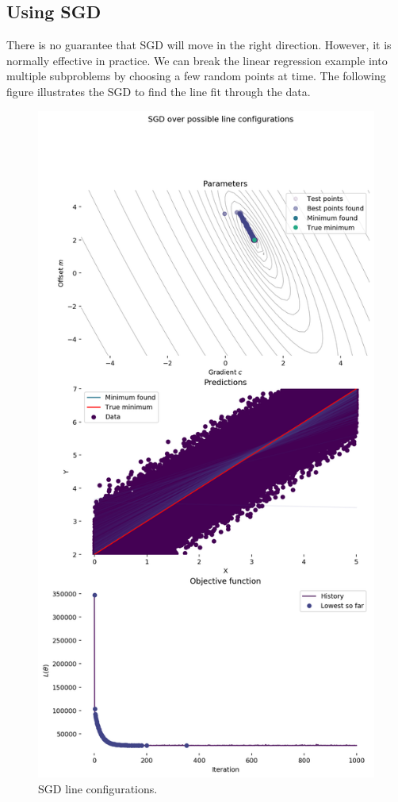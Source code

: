 \documentclass[a4paper, openany]{memoir}
\begin{document}
\subsection{Using SGD}
There is no guarantee that SGD will move in the right direction. However, it is normally effective in practice. We can break the linear regression example into multiple subproblems by choosing a few random points at time. The following figure illustrates the SGD to find the line fit through the data.
\begin{figure}[H]
    \centering
    \includegraphics[scale=0.5]{src/4.31 stochastic gradient descent line configurations.png}
    \caption{SGD line configurations.}
\end{figure}
\newpage
\end{document}
